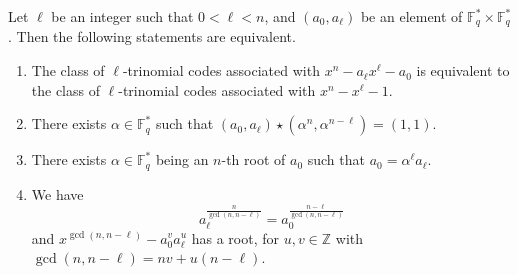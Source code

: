 \documentclass[12pt]{elsarticle}
\newcommand{\Fq}{\mathbb{F}_{q}}
\theoremstyle{break}
{\theorembodyfont{\upshape}
    \newtheorem{theorem}{Theorem}[section] %
    \newtheorem{lemma}[theorem]{Lemma} %
    \newtheorem{proposition}[theorem]{Proposition}
    \newtheorem{corollary}[theorem]{Corollary}
    \newtheorem{definition}[theorem]{Definition}
    \newtheorem{example}[theorem]{Example}
    \newtheorem{remark}[theorem]{Remark}
    \newtheorem{conjecture}[theorem]{Conjecture}
    \newtheorem*{proof}{{Proof}}
	\newtheorem*{notation}{Notation}
	\newtheorem*{main}{Cain Theorem}
	\newtheorem*{problem}{Problem}
}
\begin{document}
\begin{corollary}\label{Cor.ver2}
Let $\ell$ be an integer such that  $0<\ell<n$,  and  $(a_0, a_{\ell})$ be an element of $\mathbb{F}_q^{*} \times \mathbb{F}_q^{*}$.  Then the following statements are equivalent.
    \begin{enumerate}
        \item  The class of $\ell$-trinomial codes  associated with  $x^n - a_{\ell}x^{\ell} - a_0$ is equivalent to the class of $\ell$-trinomial codes associated with $x^n - x^{\ell} - 1.$
        \item  There exists $ \alpha \in \Fq^*$ such that $(a_0, a_{\ell})\star(\alpha^n, \alpha^{n-\ell}) = (1, 1)$. 
        \item  There exists $   \alpha \in \Fq^* $ being an $n$-th root of $a_0$  such that $   a_0 =  \alpha^\ell a_\ell $.
        \item  We have $$ a_{\ell}^{\frac{n}{\gcd(n,n-\ell)}}=a_0^{\frac{n-\ell}{{\gcd(n,n-\ell)}}}$$ and $x^{ \gcd(n,n-\ell)}-a_0^v a_{\ell}^u$ has a root, for $u,v\in \mathbb Z$ with $ \gcd(n,n-\ell)=nv+u(n-\ell) .$ 
        \end{enumerate}
\end{corollary}
\end{document}
